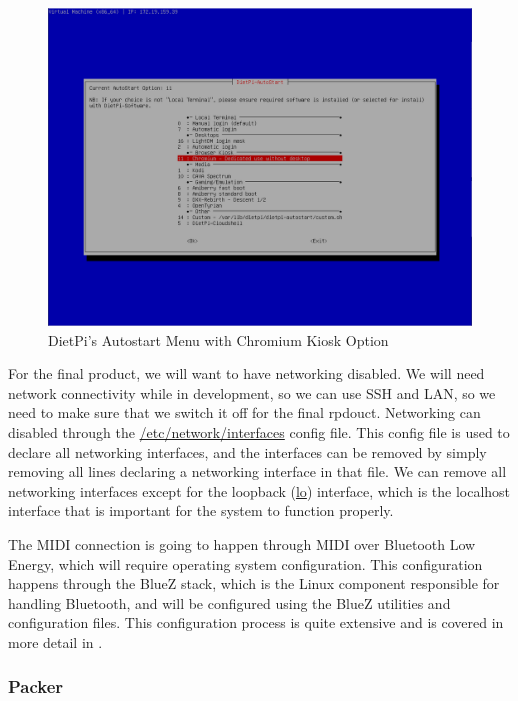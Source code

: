 \begin{figure}[h!]
  \centering
  \includegraphics[width=\linewidth]{image/dietpi-autostart.png}
  \caption{DietPi's Autostart Menu with Chromium Kiosk Option}
  \label{fig:dietpi-autostart}
\end{figure}

For the final product, we will want to have networking disabled. We will need network
connectivity while in development, so we can use SSH and LAN, so we need to make sure that
we switch it off for the final rpdouct. Networking can disabled through the
\url{/etc/network/interfaces} config file. This config file is used to declare all
networking interfaces, and the interfaces can be removed by simply removing all lines
declaring a networking interface in that file. We can remove all networking interfaces
except for the loopback (\url{lo}) interface, which is the localhost interface that is
important for the system to function properly.

The MIDI connection is going to happen through MIDI over Bluetooth Low Energy, which will
require operating system configuration. This configuration happens through the BlueZ
stack, which is the Linux component responsible for handling Bluetooth, and will be
configured using the BlueZ utilities and configuration files. This configuration process
is quite extensive and is covered in more detail in .

\subsubsection{Packer}
\label{sec:packer}

